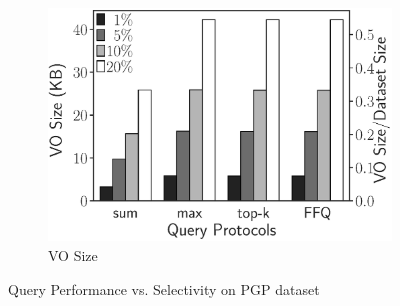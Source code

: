 \begin{figure}[t]
\begin{subfigure}[b]{.36\linewidth}
    \includegraphics[width=\linewidth]{exp-figs/aggregate-queries/pgp_vo.eps}
    \caption{VO Size}
  \end{subfigure}
  \caption{Query Performance vs. Selectivity on PGP dataset}\label{fig:aggregate-queries:pgp}


\end{figure}
